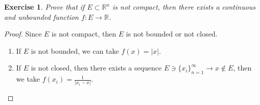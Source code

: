 \documentclass[12pt,leqno]{amsart}
\newtheorem{exercise}{Exercise}[section]
\theoremstyle{definition}
\numberwithin{equation}{subsection}
\begin{document}
\begin{exercise}
Prove that if $E\subset\mathbb{R}^n$ is not compact, then there exists a continuous and unbounded function $f:E\to\mathbb{R}$.
\end{exercise}
\begin{proof}
Since $E$ is not compact, then $E$ is not bounded or not closed. 
\begin{enumerate}
    \item If $E$ is not bounded, we can take $f(x) = |x|$.
    \item If $E$ is not closed, then there exists a sequence $E \ni\{x_i\}^\infty_{n = 1} \to x \notin E$, then we take $f(x_i) = \frac{1}{|x_i - x|}$.
\end{enumerate}
\end{proof}

\medskip
\end{document}
